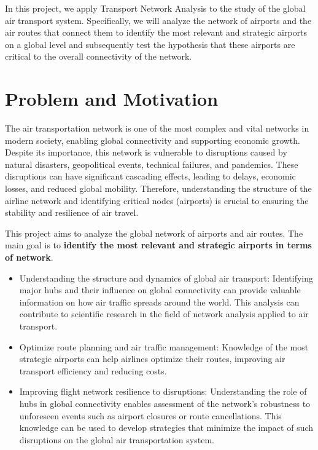 \documentclass[12pt]{article}
\begin{document}
    In this project, we apply Transport Network Analysis to the study of the global air transport system.
    Specifically, we will analyze the network of airports and the air routes that connect them to identify the most relevant and strategic airports on a global level and subsequently test the hypothesis that these airports are critical to the overall connectivity of the network.


    \section{Problem and Motivation}\label{sec:problem-and-motivation}
    The air transportation network is one of the most complex and vital networks in modern society, enabling global connectivity and supporting economic growth. Despite its importance, this network is vulnerable to disruptions caused by natural disasters, geopolitical events, technical failures, and pandemics. These disruptions can have significant cascading effects, leading to delays, economic losses, and reduced global mobility. Therefore, understanding the structure of the airline network and identifying critical nodes (airports) is crucial to ensuring the stability and resilience of air travel.

    This project aims to analyze the global network of airports and air routes.
    The main goal is to \textbf{identify the most relevant and strategic airports in terms of network}.
    \begin{itemize}
        \item Understanding the structure and dynamics of global air transport: Identifying major hubs and their influence on global connectivity can provide valuable information on how air traffic spreads around the world. This analysis can contribute to scientific research in the field of network analysis applied to air transport.
        \item Optimize route planning and air traffic management: Knowledge of the most strategic airports can help airlines optimize their routes, improving air transport efficiency and reducing costs.
        \item Improving flight network resilience to disruptions: Understanding the role of hubs in global connectivity enables assessment of the network's robustness to unforeseen events such as airport closures or route cancellations. This knowledge can be used to develop strategies that minimize the impact of such disruptions on the global air transportation system.
    \end{itemize}
\end{document}
